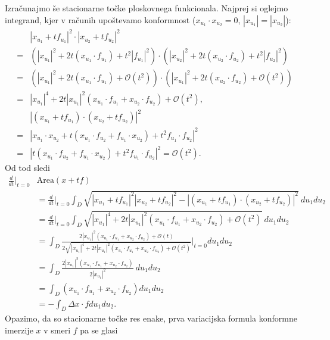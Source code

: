 \documentclass[12pt,a4paper,twoside]{article}
\theoremstyle{definition} %
\theoremstyle{plain} %
\numberwithin{equation}{section}  %
\begin{document}
Izračunajmo še stacionarne točke ploskovnega funkcionala.
Najprej si oglejmo integrand, kjer v računih upoštevamo konformnost ($x_{u_1} \cdot x_{u_2} = 0$, $|x_{u_1}| = |x_{u_2}|$):
\begin{align*}
&\left| x_{u_1}+tf_{u_1} \right|^2 \cdot \left| x_{u_2}+tf_{u_2} \right|^2 \\
= &\left( |x_{u_1}|^2 + 2t(x_{u_1} \cdot f_{u_1}) + t^2|f_{u_1}|^2 \right) \cdot \left( |x_{u_2}|^2 + 2t(x_{u_2} \cdot f_{u_2}) + t^2|f_{u_2}|^2 \right) \\
= &\left( |x_{u_1}|^2 + 2t(x_{u_1} \cdot f_{u_1}) + \mathcal{O}(t^2) \right) \cdot \left( |x_{u_1}|^2 + 2t(x_{u_2} \cdot f_{u_2}) + \mathcal{O}(t^2) \right) \\
= &\left| x_{u_1} \right|^4 + 2t \left| x_{u_1} \right|^2 \left( x_{u_1} \cdot f_{u_1} + x_{u_2} \cdot f_{u_2} \right) + \mathcal{O}(t^2), \\[5pt]
&\left| (x_{u_1}+tf_{u_1}) \cdot (x_{u_2}+tf_{u_2}) \right|^2 \\
= &\left| x_{u_1} \cdot x_{u_2} + t(x_{u_1} \cdot f_{u_2} + f_{u_1} \cdot x_{u_2}) + t^2 f_{u_1} \cdot f_{u_2} \right|^2 \\
= & \left| t(x_{u_1} \cdot f_{u_2} + f_{u_1} \cdot x_{u_2}) + t^2 f_{u_1} \cdot f_{u_2} \right|^2 = \mathcal{O}(t^2).
\end{align*}
Od tod sledi
\begin{align*}
\frac{d}{dt} \Big|_{t=0} &\text{Area}(x+tf) \\ 
	&= \frac{d}{dt} \Big|_{t=0} \int_{D} \sqrt{|x_{u_1}+tf_{u_1}|^2 |x_{u_2}+tf_{u_2}|^2 - |(x_{u_1}+tf_{u_1}) \cdot (x_{u_2}+tf_{u_2}) |^2} \ du_1 du_2 \\
	&= \frac{d}{dt} \Big|_{t=0} \int_{D} \sqrt{ |x_{u_1}|^4 + 2t |x_{u_1}|^2 (x_{u_1} \cdot f_{u_1} + x_{u_2} \cdot f_{u_2}) + \mathcal{O}(t^2)} \ du_1 du_2 \\
	&= \int_{D} \frac{2 |x_{u_1}|^2 (x_{u_1} \cdot f_{u_1} + x_{u_2} \cdot f_{u_2}) + \mathcal{O}(t)}{2 \sqrt{ |x_{u_1}|^4 + 2t |x_{u_1}|^2 (x_{u_1} \cdot f_{u_1} + x_{u_2} \cdot f_{u_2}) + \mathcal{O}(t^2)}} \bigg|_{t=0} du_1 du_2 \\
	&= \int_{D} \frac{2 |x_{u_1}|^2 (x_{u_1} \cdot f_{u_1} + x_{u_2} \cdot f_{u_2})}{2 |x_{u_1}|^2} \ du_1 du_2 \\
	&= \int_{D} (x_{u_1} \cdot f_{u_1} + x_{u_2} \cdot f_{u_2}) du_1 du_2 \\
	&= - \int_{D} \Delta{x} \cdot f du_1 du_2 .
\end{align*}
%
Opazimo, da so stacionarne točke res enake, prva variacijska formula konformne imerzije $x$ v smeri $f$ pa se glasi
\end{document}
